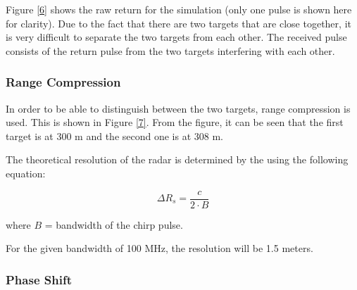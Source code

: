 \pagebreak%

Figure \ref{6} shows the raw return for the simulation (only one pulse is
shown here for clarity). Due to the fact that there are two targets that are
close together, it is very difficult to separate the two targets from each
other. The received pulse consists of the return pulse from the two targets
interfering with each other.


\subsubsection{Range Compression}

In order to be able to distinguish between the two targets, range
compression is used. This is shown in Figure \ref{7}. From the figure, it
can be seen that the first target is at 300 m and the second one is at 308 m.


The theoretical resolution of the radar is determined by the using the
following equation:

\begin{equation}
\Delta R_{s}=\frac{c}{2\cdot B}
\end{equation}

where $B$ = bandwidth of the chirp pulse.

For the given bandwidth of 100 MHz, the resolution will be 1.5
meters.\smallskip

\subsubsection{Phase Shift}

